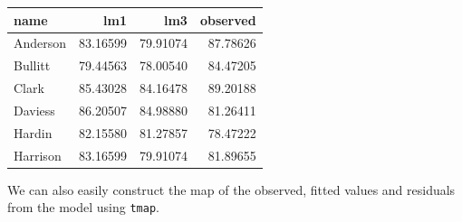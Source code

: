 \documentclass[
  letterpaper,
  DIV=11,
  numbers=noendperiod]{scrreprt}
\begin{document}
\begin{longtable*}{lrrr}
\toprule
name & lm1 & lm3 & observed \\ 
\midrule
Anderson & 83.16599 & 79.91074 & 87.78626 \\ 
Bullitt & 79.44563 & 78.00540 & 84.47205 \\ 
Clark & 85.43028 & 84.16478 & 89.20188 \\ 
Daviess & 86.20507 & 84.98880 & 81.26411 \\ 
Hardin & 82.15580 & 81.27857 & 78.47222 \\ 
Harrison & 83.16599 & 79.91074 & 81.89655 \\ 
\bottomrule
\end{longtable*}

We can also easily construct the map of the observed, fitted values and
residuals from the model using \texttt{tmap}.
\end{document}
